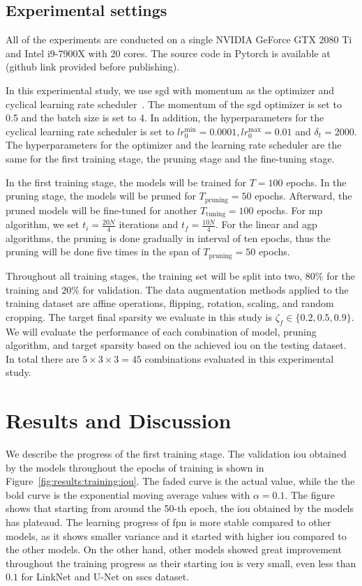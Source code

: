 \documentclass[mathematics,article,submit,pdftex,moreauthors]{Definitions/mdpi}
\begin{document}
\subsection{Experimental settings}
All of the experiments are conducted on a 
single NVIDIA GeForce GTX 2080 Ti and
Intel i9-7900X with 20 cores. The source code in Pytorch is 
available at (github link provided before publishing).

In this experimental study, we use \ac{sgd} with
momentum as the optimizer and cyclical learning
rate scheduler~\cite{Smith2017}.
The momentum of the \ac{sgd} optimizer is set to 0.5
and the batch size is set to 4.
In addition, the hyperparameters for the cyclical learning
rate scheduler is set to $lr^{\min}_0=0.0001, lr^{\max}_0=0.01$ 
and $\delta_t=2000$. The hyperparameters for the optimizer and 
the learning rate scheduler are the same for the first
training stage, the pruning stage and the fine-tuning stage.

In the first training stage, the models
will be trained for $T=100$ epochs. In the pruning stage,
the models will be pruned for $T_{\text{pruning}}=50$ epochs.
Afterward, the pruned models will be fine-tuned for another 
$T_{\text{tuning}}=100$ epochs. For \ac{mp} algorithm,
we set $t_i=\frac{20N}{4}$ iterations and $t_f=\frac{10N}{4}$.
For the linear and \ac{agp} algorithms, the pruning
is done gradually in interval of ten epochs, thus the pruning
will be done five times in the span of $T_{\text{pruning}}=50$ epochs.

Throughout all training stages,
the training set will be split into two, $80\%$ for the 
training and $20\%$ for validation. The data augmentation
methods applied to the training dataset are affine operations,
flipping, rotation, scaling, and random cropping.
The target final sparsity we evaluate in this study
is $\zeta_f \in \{0.2, 0.5, 0.9\}$. We will evaluate the performance
of each combination of model, pruning algorithm, and
target sparsity based on the achieved \ac{iou} on
the testing dataset. In total there are $5\times 3\times 3=45$
combinations evaluated in this experimental study.

\section {Results and Discussion}
We describe the progress of the first
training stage. The validation \ac{iou}
obtained by the models throughout the epochs
of training is shown in 
Figure~\ref{fig:results:training:iou}.
The faded curve is the actual value, while the 
the bold curve is the exponential moving average
values with $\alpha=0.1$. The figure shows that
starting from around the 50-th epoch, the \ac{iou}
obtained by the models has plateaud.
The learning progress of \ac{fpn} is more stable
compared to other models, as it shows smaller variance
and it started with higher \ac{iou} compared to the other models.
On the other hand, other models showed great improvement
throughout the training progress as their starting \ac{iou}
is very small, even less than $0.1$ for LinkNet and U-Net
on \ac{sscs} dataset.
\end{document}
